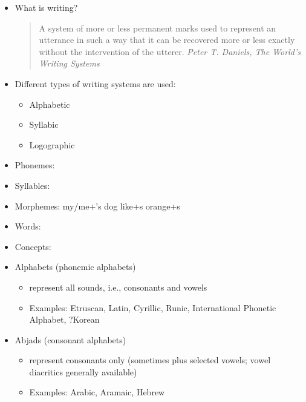 \documentclass[a4paper,landscape,headrule,footrule,xetex]{foils}
\begin{document}

\begin{itemize}
\item What is writing?
\begin{quote}
  A system of more or less permanent marks used to represent an utterance in such a way that it can be recovered more or less exactly without the intervention of the utterer.  \hfill \textit{Peter T. Daniels, The World's Writing Systems}
\end{quote}

\item Different types of writing systems are used:
\begin{itemize}
\item Alphabetic
\item Syllabic
\item Logographic
\end{itemize}
\end{itemize}





\begin{itemize}
\item Phonemes:   

\item Syllables:    
\item Morphemes:  my/me+'s dog like+s orange+s   
\item Words:  
\item Concepts:   
\end{itemize}




\begin{itemize}
\item Alphabets (phonemic alphabets)
\begin{itemize}
\item represent all sounds, i.e., consonants and vowels
\item Examples: Etruscan, Latin, Cyrillic, Runic, International Phonetic Alphabet, ?Korean 
\end{itemize}

\item Abjads (consonant alphabets)
\begin{itemize}
\item represent consonants only (sometimes plus selected vowels; vowel diacritics generally available)
\item Examples: Arabic, Aramaic, Hebrew
\end{itemize}
\end{itemize}
\end{document}
